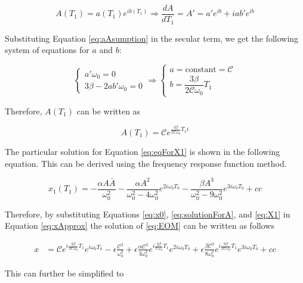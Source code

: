 %
\begin{equation}\label{eq:aAsumption}
	A(T_1) = a(T_1) e^{ib(T_1)} \Rightarrow
	\frac{dA}{dT_1} = A' = a' e^{ib} + iab' e^{ib}
\end{equation}
%

Substituting Equation \eqref{eq:aAsumption} in the secular term, we get the following system of equations for $a$ and $b$:

%
\[
\begin{cases}
	a' \omega_0 = 0 \\
	3\beta - 2 a b' \omega_0 = 0
\end{cases}
\Rightarrow
\begin{cases}
	a = \text{constant} = \mathcal{C} \\
	b = \dfrac{3 \beta}{2 \mathcal{C} \omega_0} T_1
\end{cases}
\]
%

Therefore, $A(T_1)$ can be written as

%
\begin{equation}\label{eq:solutionForA}
	A(T_1) = \mathcal{C}
	         e^{\frac{3 \beta}{2 \mathcal{C} \omega_0} T_1 i}
\end{equation}
%

The particular solution for Equation \eqref{eq:eqForX1} is shown in the following equation. This can be derived using the frequency response function method.

%
\begin{equation}\label{eq:X1}
	x_1(T_1) = 
	-\frac{\alpha A \bar{A}}{\omega_0^2}
	-\frac{\alpha A^2}{\omega_0^2 - 4\omega_0^2} e^{2i\omega_0 T_0}
	-\frac{\beta A^3}{\omega_0^2 - 9\omega_0^2} e^{3i\omega_0 T_0} + cc
\end{equation}
%

Therefore, by substituting Equations \eqref{eq:x0}, \eqref{eq:solutionForA}, and \eqref{eq:X1} in Equation \eqref{eq:xApprox} the solution of \eqref{eq:EOM} can be written as follows

%
\begin{align}\label{eq:x}
	x &= 
	\mathcal{C} e^{i\frac{3 \beta}{2 \mathcal{C} \omega_0} T_1} e^{i\omega_0 T_0}
	- \epsilon \frac{\mathcal{C}^2}{\omega_0^2}
	+ \epsilon \frac{\alpha \mathcal{C}^2}{3\omega_0^2} e^{i\frac{3 \beta}{\mathcal{C} \omega_0} T_1} e^{2i\omega_0 T_0}
	+ \epsilon \frac{\beta \mathcal{C}^3}{8\omega_0^2} e^{i\frac{9 \beta}{2 \mathcal{C} \omega_0} T_1}e^{3i\omega_0 T_0} + cc
\end{align}
%

This can further be simplified to

